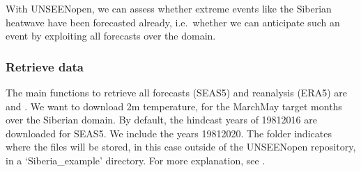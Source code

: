 \documentclass[letterpaper,10pt,english]{sphinxmanual}
\begin{document}

With UNSEEN\sphinxhyphen{}open, we can assess whether extreme events like the Siberian heatwave have been forecasted already, i.e. whether we can anticipate such an event by exploiting all forecasts over the domain.


\subsubsection{Retrieve data}
\label{\detokenize{Notebooks/examples/Siberian_Heatwave:Retrieve-data}}
The main functions to retrieve all forecasts (SEAS5) and reanalysis (ERA5) are  and . We want to download 2m temperature, for the March\sphinxhyphen{}May target months over the Siberian domain. By default, the hindcast years of 1981\sphinxhyphen{}2016 are downloaded for SEAS5. We include the years 1981\sphinxhyphen{}2020. The folder indicates where the files will be stored, in this case outside of the UNSEEN\sphinxhyphen{}open repository, in a ‘Siberia\_example’ directory. For more explanation, see
{\hyperref[\detokenize{Notebooks/1.Download/1.Retrieve::doc}]{}}.

{
\begin{sphinxVerbatim}[commandchars=\\\{\}]
\llap{\color{nbsphinxin}[ ]:\,\hspace{\fboxrule}\hspace{\fboxsep}}
    \PYG{p}{[} \PYG{p}{]}
    \PYG{p}{[}  \PYG{p}{]}
    \PYG{p}{[}   \PYG{p}{]}
     
\end{sphinxVerbatim}
}
\end{document}
